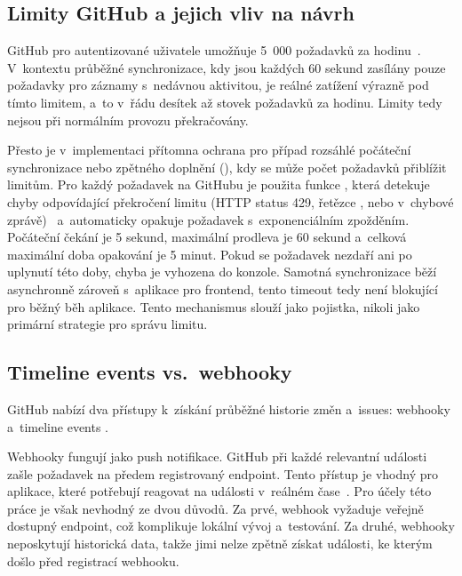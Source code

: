 \subsection{Limity GitHub \API a jejich vliv na návrh}
\label{subsec:implementation:gotchas:rate_limits}

GitHub \REST \API pro autentizované uživatele umožňuje 5~000 požadavků za hodinu~\cite{github_rest_api}. V~kontextu průběžné synchronizace, kdy jsou každých 60 sekund zasílány pouze požadavky pro záznamy s~nedávnou aktivitou, je reálné zatížení výrazně pod tímto limitem, a~to v~řádu desítek až stovek požadavků za hodinu. Limity tedy nejsou při normálním provozu překračovány.

Přesto je v~implementaci přítomna ochrana pro případ rozsáhlé počáteční synchronizace nebo zpětného doplnění (), kdy se může počet požadavků přiblížit limitům. Pro každý požadavek na \API GitHubu je použita funkce , která detekuje chyby odpovídající překročení limitu (HTTP status 429, řetězce ,  nebo  v~chybové zprávě)~\cite{github_rest_api} a~automaticky opakuje požadavek s~exponenciálním zpožděním. Počáteční čekání je 5 sekund, maximální prodleva je 60 sekund a~celková maximální doba opakování je 5 minut.
Pokud se požadavek nezdaří ani po uplynutí této doby, chyba je vyhozena do konzole. Samotná synchronizace běží asynchronně zároveň s~\API aplikace pro frontend, tento timeout tedy není blokující pro běžný běh aplikace. Tento mechanismus slouží jako pojistka, nikoli jako primární strategie pro správu limitu.

\subsection{Timeline events vs.\ webhooky}
\label{subsec:implementation:gotchas:timeline_vs_webhooks}

GitHub nabízí dva přístupy k~získání průběžné historie změn \PR a~issues: webhooky a~timeline events \API.

Webhooky fungují jako push notifikace. GitHub při každé relevantní události zašle \HTTP požadavek na předem registrovaný endpoint. Tento přístup je vhodný pro aplikace, které potřebují reagovat na události v~reálném čase~\cite{github_webhooks}. Pro účely této práce je však nevhodný ze dvou důvodů. Za prvé, webhook vyžaduje veřejně dostupný endpoint, což komplikuje lokální vývoj a~testování. Za druhé, webhooky neposkytují historická data, takže jimi nelze zpětně získat události, ke kterým došlo před registrací webhooku.

